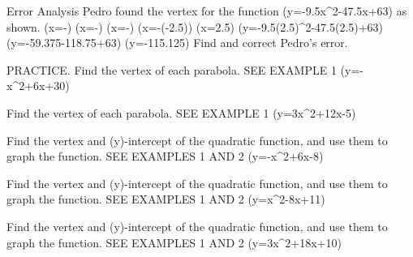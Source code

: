 \documentclass{article}
\newenvironment{practice}[2]{}{}        %
\newcommand{\answer}[1]{}               %
\newcommand{\placeholder}[2]{}          %
\newcommand{\te}[1]{}                   %
\begin{document}
\begin{practice}{14}{2}
Error Analysis Pedro found the vertex for the function (y=-9.5x^2-47.5x+63) as shown.
(x=-)
(x=-)
(x=-)
(x=-(-2.5))
(x=2.5)
(y=-9.5(2.5)^2-47.5(2.5)+63)
(y=-59.375-118.75+63)
(y=-115.125)
Find and correct Pedro's error.
\answer{Micah forgot to use the sign associated with the value of (b).
(x=-\frac{b}{2a})
(x=-\frac{-47.5}{2(-9.5)})
(x=\frac{47.5}{-19})
(x=-2.5)
(y=-9.5(-2.5)^2-47.5(-2.5)+63)
(=-59.375+118.75+63)
(=122.375)}
\te{Printed prompt names Pedro; printed answer names Micah, likely referring to Pedro.}
\end{practice}
\begin{practice}{15}{1}
PRACTICE. Find the vertex of each parabola. SEE EXAMPLE 1
(y=-x^2+6x+30)
\answer{(3,39)}
\end{practice}
\begin{practice}{16}{1}
Find the vertex of each parabola. SEE EXAMPLE 1
(y=3x^2+12x-5)
\answer{(-2,-17)}
\end{practice}
\begin{practice}{17}{2}
Find the vertex and (y)-intercept of the quadratic function, and use them to graph the function. SEE EXAMPLES 1 AND 2
(y=-x^2+6x-8)
\answer{vertex: (3,1); (y)-intercept: (0,-8)}
\placeholder{graph}{Answer 17: red downward parabola (y=-x^2+6x-8), vertex (3,1), intercepts (2,0),(4,0); both lower ends arrowed. Black arrowed (x),(y) axes, O at origin, unit grid over [-5,5] on both axes, tick labels -4,-2,2,4.}
\end{practice}
\begin{practice}{18}{2}
Find the vertex and (y)-intercept of the quadratic function, and use them to graph the function. SEE EXAMPLES 1 AND 2
(y=x^2-8x+11)
\answer{vertex: (4,-5); (y)-intercept: (0,11)}
\placeholder{graph}{Answer 18, printed on PDF page 32: red upward parabola (y=x^2-8x+11), vertex (4,-5), (y)-intercept (0,11), both upper ends arrowed. Black arrowed (x),(y) axes, origin O, grid spacing 2, window (x) [-10,10], (y) [-8,12], (x) labels -8,-4,4,8, (y) labels -4,4,8.}
\end{practice}
\begin{practice}{19}{2}
Find the vertex and (y)-intercept of the quadratic function, and use them to graph the function. SEE EXAMPLES 1 AND 2
(y=3x^2+18x+10)
\answer{vertex: (-3,-17); (y)-intercept: (0,10)}
\placeholder{graph}{Answer 19, PDF page 32: red upward parabola (y=3x^2+18x+10), vertex (-3,-17), (y)-intercept (0,10), both upper ends arrowed. Black arrowed (x),(y) axes, O at origin, grid spacing 5, window [-25,25] both axes, labels -20,-10,10,20.}
\end{practice}
\end{document}
